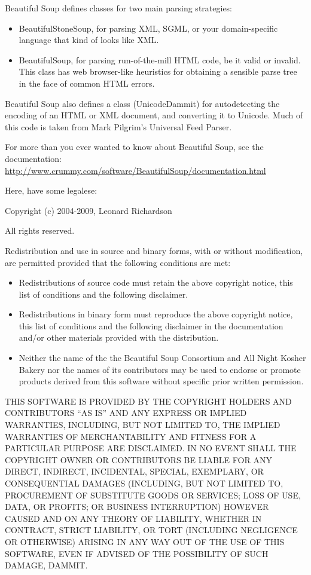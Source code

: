 \documentclass[letterpaper,10pt,english]{sphinxmanual}
\begin{document}
Beautiful Soup defines classes for two main parsing strategies:
\begin{itemize}
\item {} 
BeautifulStoneSoup, for parsing XML, SGML, or your domain-specific
language that kind of looks like XML.

\item {} 
BeautifulSoup, for parsing run-of-the-mill HTML code, be it valid
or invalid. This class has web browser-like heuristics for
obtaining a sensible parse tree in the face of common HTML errors.

\end{itemize}

Beautiful Soup also defines a class (UnicodeDammit) for autodetecting
the encoding of an HTML or XML document, and converting it to
Unicode. Much of this code is taken from Mark Pilgrim's Universal Feed Parser.

For more than you ever wanted to know about Beautiful Soup, see the
documentation:
\href{http://www.crummy.com/software/BeautifulSoup/documentation.html}{http://www.crummy.com/software/BeautifulSoup/documentation.html}

Here, have some legalese:

Copyright (c) 2004-2009, Leonard Richardson

All rights reserved.

Redistribution and use in source and binary forms, with or without
modification, are permitted provided that the following conditions are
met:
\begin{itemize}
\item {} 
Redistributions of source code must retain the above copyright
notice, this list of conditions and the following disclaimer.

\item {} 
Redistributions in binary form must reproduce the above
copyright notice, this list of conditions and the following
disclaimer in the documentation and/or other materials provided
with the distribution.

\item {} 
Neither the name of the the Beautiful Soup Consortium and All
Night Kosher Bakery nor the names of its contributors may be
used to endorse or promote products derived from this software
without specific prior written permission.

\end{itemize}

THIS SOFTWARE IS PROVIDED BY THE COPYRIGHT HOLDERS AND CONTRIBUTORS
``AS IS'' AND ANY EXPRESS OR IMPLIED WARRANTIES, INCLUDING, BUT NOT
LIMITED TO, THE IMPLIED WARRANTIES OF MERCHANTABILITY AND FITNESS FOR
A PARTICULAR PURPOSE ARE DISCLAIMED. IN NO EVENT SHALL THE COPYRIGHT OWNER OR
CONTRIBUTORS BE LIABLE FOR ANY DIRECT, INDIRECT, INCIDENTAL, SPECIAL,
EXEMPLARY, OR CONSEQUENTIAL DAMAGES (INCLUDING, BUT NOT LIMITED TO,
PROCUREMENT OF SUBSTITUTE GOODS OR SERVICES; LOSS OF USE, DATA, OR
PROFITS; OR BUSINESS INTERRUPTION) HOWEVER CAUSED AND ON ANY THEORY OF
LIABILITY, WHETHER IN CONTRACT, STRICT LIABILITY, OR TORT (INCLUDING
NEGLIGENCE OR OTHERWISE) ARISING IN ANY WAY OUT OF THE USE OF THIS
SOFTWARE, EVEN IF ADVISED OF THE POSSIBILITY OF SUCH DAMAGE, DAMMIT.
\end{document}
